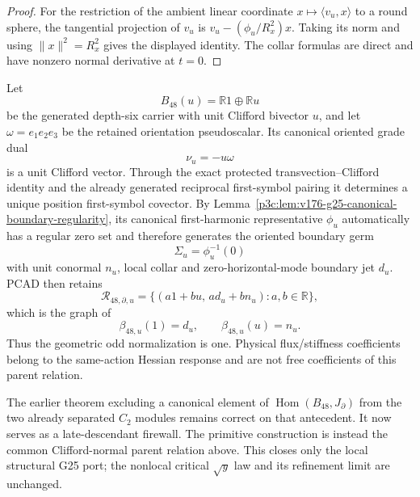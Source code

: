 \documentclass[12pt,a4paper]{article}
\begin{document}
\begin{proof}
For the restriction of the ambient linear coordinate
$x\mapsto\langle v_u,x\rangle$ to a round sphere, the tangential projection of
$v_u$ is $v_u-(\phi_u/R_x^2)x$.  Taking its norm and using
$\|x\|^2=R_x^2$ gives the displayed identity.  The collar formulas are direct
and have nonzero normal derivative at $t=0$.
\end{proof}

\begin{theorem}
\label{p3c:thm:v187-b48-boundary-parent}
Let
\[
 B_{48}(u)=\mathbb R1\oplus\mathbb Ru
\]
be the generated depth-six carrier with unit Clifford bivector $u$, and let
$\omega=e_1e_2e_3$ be the retained orientation pseudoscalar.  Its canonical
oriented grade dual
\[
 \boxed{\nu_u=-u\omega}
\]
is a unit Clifford vector.  Through the exact protected
transvection--Clifford identity and the already generated reciprocal
first-symbol pairing it determines a unique position first-symbol covector.
By Lemma~\ref{p3c:lem:v176-g25-canonical-boundary-regularity}, its canonical
first-harmonic representative $\phi_u$ automatically has a regular zero set
and therefore generates the oriented boundary germ
\[
 \Sigma_u=\phi_u^{-1}(0)
\]
with unit conormal $n_u$, local collar and zero-horizontal-mode boundary jet
$d_u$.  PCAD then retains
\[
 \mathcal R_{48,\partial,u}
 =\{(a1+bu,\,a d_u+b n_u):a,b\in\mathbb R\},
\]
which is the graph of
\[
 \boxed{\beta_{48,u}(1)=d_u,\qquad
 \beta_{48,u}(u)=n_u.}
\]
Thus the geometric odd normalization is one.  Physical flux/stiffness
coefficients belong to the same-action Hessian response and are not free
coefficients of this parent relation.
\end{theorem}

\begin{remark}
\label{p3c:rem:v187-g25-nogo-scope}
The earlier theorem excluding a canonical element of
$\operatorname{Hom}(B_{48},J_\partial)$ from the two already separated
$C_2$ modules remains correct on that antecedent.  It now serves as a
late-descendant firewall.  The primitive construction is instead the common
Clifford-normal parent relation above.  This closes only the local structural
G25 port; the nonlocal critical $\sqrt y$ law and its refinement limit are
unchanged.
\end{remark}
\end{document}
